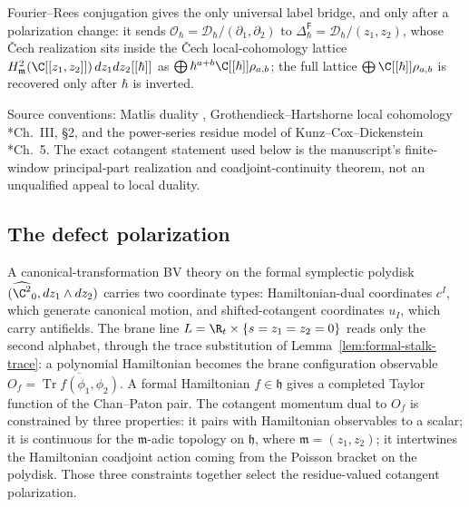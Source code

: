 Fourier--Rees conjugation gives the only universal
label bridge, and only after a polarization change: it sends
\(\mathcal O_\hbar=\mathcal D_\hbar/(\partial_1,\partial_2)\) to
\(\Delta^{\mathsf F}_\hbar=\mathcal D_\hbar/(z_1,z_2)\), whose \v{C}ech
realization sits inside the \v{C}ech local-cohomology lattice
\(H^2_{\mathfrak m}(\C[[z_1,z_2]])\,dz_1dz_2[[\hbar]]\) as
\(\bigoplus\hbar^{a+b}\C[[\hbar]]\rho_{a,b}\); the full lattice
\(\bigoplus\C[[\hbar]]\rho_{a,b}\) is recovered only after \(\hbar\) is
inverted.

Source conventions: Matlis duality \cite{matlis-injective},
Grothendieck--Hartshorne local cohomology
\cite{hartshorne-local-cohomology}*{Ch.~III, \S2}, and the
power-series residue model of Kunz--Cox--Dickenstein
\cite{kunz-residues-duality}*{Ch.~5}.  The exact cotangent statement used
below is the manuscript's finite-window principal-part realization and
coadjoint-continuity theorem, not an unqualified appeal to local duality.

\subsection{The defect polarization}
\label{ssec:app-defect-polarization}

A canonical-transformation BV theory on the formal symplectic polydisk
\((\widehat{\C^2}_0,dz_1\wedge dz_2)\) carries two coordinate types:
Hamiltonian-dual coordinates \(c^I\), which generate canonical motion,
and shifted-cotangent coordinates \(u_I\), which carry antifields.  The
brane line \(L=\R_t\times\{s=z_1=z_2=0\}\) reads only the second
alphabet, through the trace substitution of
Lemma~\ref{lem:formal-stalk-trace}: a polynomial Hamiltonian becomes
the brane configuration observable
\(O_f=\overline{\operatorname{Tr}f(\phi_1,\phi_2)}\).  A formal
Hamiltonian \(f\in\mathfrak h\) gives a completed Taylor function of
the Chan--Paton pair.  The cotangent
momentum dual to \(O_f\) is constrained by three properties: it pairs
with Hamiltonian observables to a scalar; it is continuous for the
\(\mathfrak m\)-adic topology on \(\mathfrak h\), where
\(\mathfrak m=(z_1,z_2)\); it intertwines the Hamiltonian coadjoint
action coming from the Poisson bracket on the polydisk.  Those three
constraints together select the residue-valued cotangent polarization.

